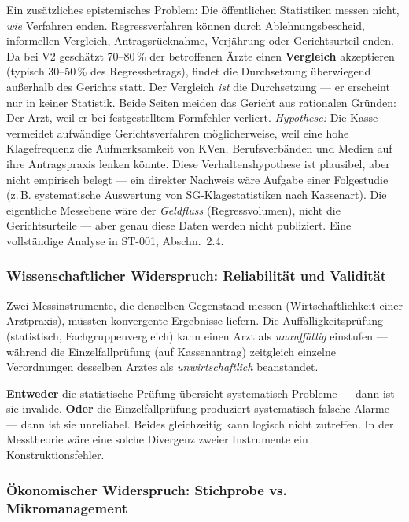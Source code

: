 \documentclass{umbruch-position}
\begin{document}
Ein zusätzliches epistemisches Problem: Die öffentlichen Statistiken messen nicht, \textit{wie} Verfahren enden. Regressverfahren können durch Ablehnungsbescheid, informellen Vergleich, Antragsrücknahme, Verjährung oder Gerichtsurteil enden. Da bei V2 geschätzt 70--80\,\% der betroffenen Ärzte einen \textbf{Vergleich} akzeptieren (typisch 30--50\,\% des Regressbetrags), findet die Durchsetzung überwiegend außerhalb des Gerichts statt. Der Vergleich \textit{ist} die Durchsetzung --- er erscheint nur in keiner Statistik. Beide Seiten meiden das Gericht aus rationalen Gründen: Der Arzt, weil er bei festgestelltem Formfehler verliert. \textit{Hypothese:} Die Kasse vermeidet aufwändige Gerichtsverfahren möglicherweise, weil eine hohe Klagefrequenz die Aufmerksamkeit von KVen, Berufsverbänden und Medien auf ihre Antragspraxis lenken könnte. Diese Verhaltenshypothese ist plausibel, aber nicht empirisch belegt --- ein direkter Nachweis wäre Aufgabe einer Folgestudie (z.\,B. systematische Auswertung von SG-Klagestatistiken nach Kassenart). Die eigentliche Messebene wäre der \textit{Geldfluss} (Regressvolumen), nicht die Gerichtsurteile --- aber genau diese Daten werden nicht publiziert. Eine vollständige Analyse in ST-001, Abschn.~2.4.

\subsubsection{Wissenschaftlicher Widerspruch: Reliabilität und Validität}

Zwei Messinstrumente, die denselben Gegenstand messen (Wirtschaftlichkeit einer Arztpraxis), müssten konvergente Ergebnisse liefern. Die Auffälligkeitsprüfung (statistisch, Fachgruppenvergleich) kann einen Arzt als \textit{unauffällig} einstufen — während die Einzelfallprüfung (auf Kassenantrag) zeitgleich einzelne Verordnungen desselben Arztes als \textit{unwirtschaftlich} beanstandet.

\textbf{Entweder} die statistische Prüfung übersieht systematisch Probleme — dann ist sie invalide. \textbf{Oder} die Einzelfallprüfung produziert systematisch falsche Alarme — dann ist sie unreliabel. Beides gleichzeitig kann logisch nicht zutreffen. In der Messtheorie wäre eine solche Divergenz zweier Instrumente ein Konstruktionsfehler.

\subsubsection{Ökonomischer Widerspruch: Stichprobe vs. Mikromanagement}
\end{document}
